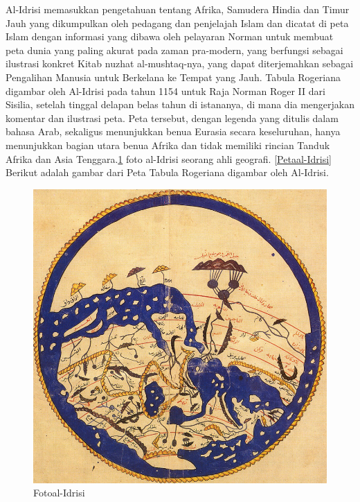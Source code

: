 	Al-Idrisi memasukkan pengetahuan tentang Afrika, Samudera Hindia dan Timur Jauh yang dikumpulkan oleh pedagang dan penjelajah Islam dan dicatat di peta Islam dengan informasi yang dibawa oleh pelayaran Norman untuk membuat peta dunia yang paling akurat pada zaman pra-modern, yang berfungsi sebagai ilustrasi konkret Kitab nuzhat al-mushtaq-nya, yang dapat diterjemahkan sebagai Pengalihan Manusia untuk Berkelana ke Tempat yang Jauh. 
	Tabula Rogeriana digambar oleh Al-Idrisi pada tahun 1154 untuk Raja Norman Roger II dari Sisilia, setelah tinggal delapan belas tahun di istananya, di mana dia mengerjakan komentar dan ilustrasi peta. Peta tersebut, dengan legenda yang ditulis dalam bahasa Arab, sekaligus menunjukkan benua Eurasia secara keseluruhan, hanya menunjukkan bagian utara benua Afrika dan tidak memiliki rincian Tanduk Afrika dan Asia Tenggara.\ref{Fotoal-Idrisi} foto al-Idrisi seorang ahli geografi.
	\ref{Petaal-Idrisi} Berikut adalah gambar dari Peta Tabula Rogeriana digambar oleh Al-Idrisi.
	\begin{figure} [ht]
	\centerline{\includegraphics[width=1\textwidth]{figures/1.jpg}}
	\caption{Fotoal-Idrisi}
	\label{Fotoal-Idrisi}
	\end{figure}
	 
	


